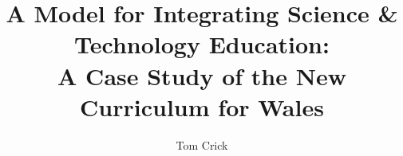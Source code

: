 \documentclass[sigconf]{acmart}
\begin{document}
\title[A Model for Integrating Science \& Technology Education in Wales]{A
  Model for Integrating Science \& Technology Education:\\A Case Study of the
  New Curriculum for Wales}


\author{Tom Crick}


\end{document}
